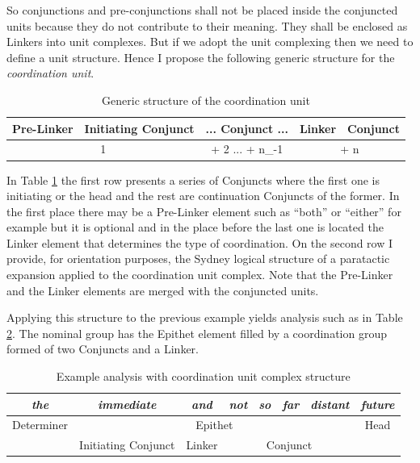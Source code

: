 So conjunctions and pre-conjunctions shall not be placed inside the conjuncted units because they do not contribute to their meaning. They shall be enclosed as Linkers into unit complexes. But if we adopt the unit complexing then we need to define a unit structure. Hence I propose the following generic structure for the \textit{coordination unit}.

\begin{table}[!h]
    \centering
    \begin{tabular}{|c|c|c|c|c|}
        \hline
        Pre-Linker & Initiating Conjunct & ... Conjunct ... & Linker & Conjunct \\ \hline
        \multicolumn{2}{|c|}{1} & + 2 ... + n_{-1} & \multicolumn{2}{c|}{+ n} \\ \hline
    \end{tabular}
    \caption{Generic structure of the coordination unit}
    \label{tab:coordination-complex}
\end{table}

In Table \ref{tab:coordination-complex} the first row presents a series of Conjuncts where the first one is initiating or the head and the rest are continuation Conjuncts of the former. In the first place there may be a Pre-Linker element such as ``both'' or ``either'' for example but it is optional and in the place before the last one is located the Linker element that determines the type of coordination. On the second row I provide, for orientation purposes, the Sydney logical structure of a paratactic expansion applied to the coordination unit complex. Note that the Pre-Linker and the Linker elements are merged with the conjuncted units.

Applying this structure to the previous example yields analysis such as in Table \ref{tab:distant-future-compelx}. The nominal group has the Epithet element filled by a coordination group formed of two Conjuncts and a Linker.

\begin{table}[H]
    \centering
    \begin{tabular}{c|c|c|c|c|c|c|c}
        \hline
        \multicolumn{1}{|c|}{\textit{the}} & \textit{immediate} & \textit{and} & \textit{not} & \textit{so} & \textit{far} & \textit{distant} & \multicolumn{1}{c|}{\textit{future}} \\ \hline
        \multicolumn{1}{|c|}{Determiner} & \multicolumn{6}{c|}{Epithet} & \multicolumn{1}{c|}{Head} \\ \hline
        & Initiating Conjunct & Linker & \multicolumn{4}{c|}{Conjunct} &  \\ \cline{2-7}
    \end{tabular}
    \caption{Example analysis with coordination unit complex structure}
    \label{tab:distant-future-compelx}
\end{table}

